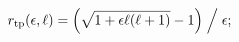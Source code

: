 \[\mathop{r_{\mathrm{tp}}\/}\nolimits\!\left(\epsilon,\ell\right)=\left(\sqrt{1+%
\epsilon\ell(\ell+1)}-1\right)\Bigm{/}\epsilon;\]